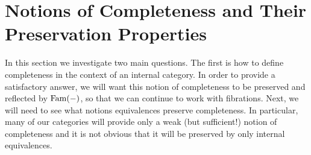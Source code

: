\section{Notions of Completeness and Their Preservation Properties}\label{sec:completeness}

In this section we investigate two main questions. The first is how to
define completeness in the context of an internal category. In order
to provide a satisfactory answer, we will want this notion of
completeness to be preserved and reflected by $\operatorname{Fam}(-)$, so that we
can continue to work with fibrations. Next, we will need to see what
notions equivalences preserve completeness. In particular, many of our
categories will provide only a weak (but sufficient!) notion of
completeness and it is not obvious that it will be preserved by only
internal equivalences.

